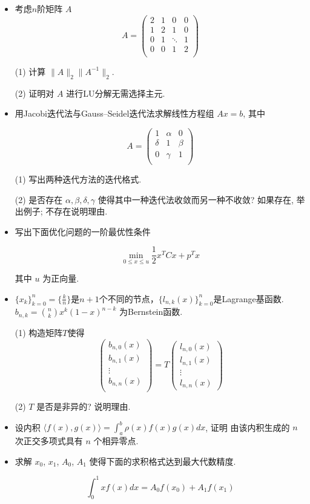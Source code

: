 \begin{itemize}
		
	\item[1.] 考虑$n$阶矩阵 $A$
		\[  A=\begin{pmatrix}
			2 & 1 & 0 &0\\
			1 & 2 & 1 &0 \\
			0 & 1 & \ddots &1\\
			0 & 0 & 1 &2\\
		\end{pmatrix}\]
		
	(1) 计算 $\|A\|_2 \|A^{-1}\|_2$.
		
	(2) 证明对 $A$ 进行LU分解无需选择主元. 
		
	\item[2.] 用Jacobi迭代法与Gauss--Seidel迭代法求解线性方程组 $Ax=b$, 其中
		
	\[  A=\begin{pmatrix}
			1 & \alpha & 0\\
			\delta & 1 & \beta\\
			0 & \gamma &1 \\
	\end{pmatrix}\]
		
	(1) 写出两种迭代方法的迭代格式. 
		
	(2) 是否存在 $\alpha, \beta, \delta, \gamma$ 使得其中一种迭代法收敛而另一种不收敛? 如果存在, 举出例子; 不存在说明理由. 
		
	\item[3.] 写出下面优化问题的一阶最优性条件
		
	\[\min_{0 \leq x \leq u} \frac{1}{2}x^T C x + p^T x\]
		
	其中 $u$ 为正向量.
		
	\item[4.] $\{x_k\}_{k=0}^{n}=\{{\frac{k}{n}}\}$是$n+1$个不同的节点，$\{l_{n,k}(x)\}_{k=0}^{n}$是Lagrange基函数. $b_{n,k} = \binom{n}{k} x^k (1-x)^{n-k}$ 为Bernstein函数. 
		
	(1) 构造矩阵$T$使得
	\[ \begin{pmatrix}
			b_{n,0}(x)\\
			b_{n,1}(x)\\
			\vdots\\
			b_{n,n}(x)\\
	\end{pmatrix}=T\begin{pmatrix}
			l_{n,0}(x)\\
			l_{n,1}(x)\\
			\vdots\\
			l_{n,n}(x)
	\end{pmatrix}\]
		
	(2) $T$ 是否是非异的? 说明理由. 
		
	\item[5.] 
	设内积 $\langle f(x), g(x)\rangle = \int_a^b \rho(x)f(x)g(x)dx$, 证明 由该内积生成的 $n$ 次正交多项式具有 $n$ 个相异零点. 
		
	\item[6.]
		
	求解 $x_0$, $x_1$, $A_0$, $A_1$ 使得下面的求积格式达到最大代数精度. 
		
	\[\int_{0}^{1}xf(x)dx = A_0f(x_0) +A_1f(x_1)\]
		
\end{itemize}